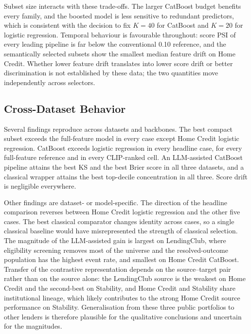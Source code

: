 \documentclass[preprint,12pt]{elsarticle}
\newcommand{\Kfeat}{K}
\begin{document}
Subset size interacts with these trade-offs. The larger CatBoost budget benefits every family, and the boosted model is less sensitive to redundant predictors, which is consistent with the decision to fix $\Kfeat=40$ for CatBoost and $\Kfeat=20$ for logistic regression. Temporal behaviour is favourable throughout: score PSI of every leading pipeline is far below the conventional 0.10 reference, and the semantically selected subsets show the smallest median feature drift on Home Credit. Whether lower feature drift translates into lower score drift or better discrimination is not established by these data; the two quantities move independently across selectors.

\subsection{Cross-Dataset Behavior}
\label{subsec:cross_dataset}

Several findings reproduce across datasets and backbones. The best compact subset exceeds the full-feature model in every case except Home Credit logistic regression. CatBoost exceeds logistic regression in every headline case, for every full-feature reference and in every CLIP-ranked cell. An LLM-assisted CatBoost pipeline attains the best KS and the best Brier score in all three datasets, and a classical wrapper attains the best top-decile concentration in all three. Score drift is negligible everywhere.

Other findings are dataset- or model-specific. The direction of the headline comparison reverses between Home Credit logistic regression and the other five cases. The best classical comparator changes identity across cases, so a single classical baseline would have misrepresented the strength of classical selection. The magnitude of the LLM-assisted gain is largest on LendingClub, where eligibility screening removes most of the universe and the resolved-outcome population has the highest event rate, and smallest on Home Credit CatBoost. Transfer of the contrastive representation depends on the source--target pair rather than on the source alone: the LendingClub source is the weakest on Home Credit and the second-best on Stability, and Home Credit and Stability share institutional lineage, which likely contributes to the strong Home Credit source performance on Stability. Generalisation from these three public portfolios to other lenders is therefore plausible for the qualitative conclusions and uncertain for the magnitudes.
\end{document}
